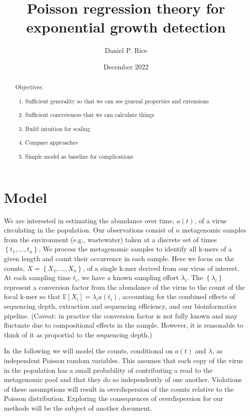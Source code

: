 \documentclass[12pt, letterpaper]{article}
\title{Poisson regression theory for exponential growth detection}
\author{Daniel P. Rice}
\date{December 2022}
\begin{document}
\maketitle

\begin{abstract}
    Objectives:
    \begin{enumerate}
        \item Sufficient generality so that we can see general properties and extensions
        \item Sufficient concreteness that we can calculate things
        \item Build intuition for scaling
        \item Compare approaches
        \item Simple model as baseline for complications
    \end{enumerate}
\end{abstract}

\tableofcontents

\section{Model}

We are interested in estimating the abundance over time, $a(t)$, of a virus circulating in the population.
Our observations consist of $n$ metagenomic samples from the environment (e.g., wastewater) taken at a discrete set of times $\left\{t_1, \ldots, t_n\right\}$.
We process the metagenomic samples to identify all k-mers of a given length and count their occurrence in each sample.
Here we focus on the counts, $X = \left\{X_1, \ldots, X_n\right\}$, of a single k-mer derived from our virus of interest.
At each sampling time $t_i$, we have a known sampling effort $\lambda_i$.
The $\left\{\lambda_i\right\}$ represent a conversion factor from the abundance of the virus to the count of the focal k-mer so that $\mathbb{E}\left[X_i\right] = \lambda_i a(t_i)$,
accounting for the combined effects of sequencing depth, extraction and sequencing efficiency, and our bioinformatics pipeline.
(Caveat: in practice the conversion factor is not fully known and may fluctuate due to compositional effects in the sample. However, it is reasonable to think of it as proportial to the sequencing depth.)

In the following we will model the counts, conditional on $a(t)$ and $\lambda$, as independent Poisson random variables.
This assumes that each copy of the virus in the population has a small probability of contributing a read to the metagenomic pool and that they do so independently of one another.
Violations of these assumptions will result in overdispersion of the counts relative to the Poisson distribution.
Exploring the consequences of overdispersion for our methods will be the subject of another document.
\end{document}
